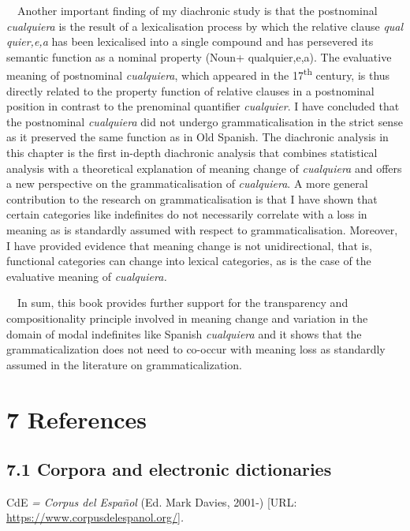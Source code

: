 \begin{styleStandard}
\ \ Another important finding of my diachronic study is that the postnominal \textit{cualquiera} is the result of a lexicalisation process by which the relative clause \textit{qual} \textit{quier,e,a} has been lexicalised into a single compound and has persevered its semantic function as a nominal property (Noun+ qualquier,e,a). The evaluative meaning of postnominal \textit{cualquiera}, which appeared in the 17\textsuperscript{th} century, is thus directly related to the property function of relative clauses in a postnominal position in contrast to the prenominal quantifier \textit{cualquier}. I have concluded that the postnominal \textit{cualquiera} did not undergo grammaticalisation in the strict sense as it preserved the same function as in Old Spanish. The diachronic analysis in this chapter is the first in-depth diachronic analysis that combines statistical analysis with a theoretical explanation of meaning change of \textit{cualquiera} and offers a new perspective on the grammaticalisation of \textit{cualquiera}. A more general contribution to the research on grammaticalisation is that I have shown that certain categories like indefinites do not necessarily correlate with a loss in meaning as is standardly assumed with respect to grammaticalisation. Moreover, I have provided evidence that meaning change is not unidirectional, that is, functional categories can change into lexical categories, as is the case of the evaluative meaning of \textit{cualquiera. }
\end{styleStandard}

\begin{styleStandard}
\ \ In sum, this book provides further support for the transparency and compositionality principle involved in meaning change and variation in the domain of modal indefinites like Spanish \textit{cualquiera} and it shows that the grammaticalization does not need to co-occur with meaning loss as standardly assumed in the literature on grammaticalization. 
\end{styleStandard}

\clearpage\section[7 References]{\textbf{7} \textbf{References}}
\subsection[7.1 Corpora and electronic dictionaries]{7.1 Corpora and electronic dictionaries}
\begin{styleStandard}
CdE \textit{= Corpus del Español} (Ed. Mark Davies, 2001-) [URL: \url{https://www.corpusdelespanol.org/}]\textit{.}
\end{styleStandard}

